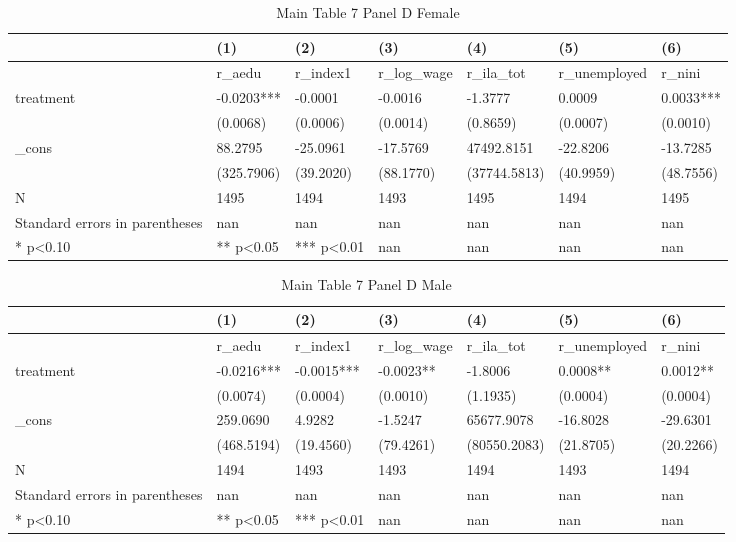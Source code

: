 \documentclass[11pt]{article}
\begin{document}
\clearpage
\begin{table}[!htbp]
\centering
\caption{Main Table 7 Panel D Female}
\label{tab:table7d_f}
\begin{tabular}{lllllll}
\toprule
 & (1) & (2) & (3) & (4) & (5) & (6) \\
\midrule
 & r\_aedu & r\_index1 & r\_log\_wage & r\_ila\_tot & r\_unemployed & r\_nini \\
treatment & -0.0203*** & -0.0001 & -0.0016 & -1.3777 & 0.0009 & 0.0033*** \\
 & (0.0068) & (0.0006) & (0.0014) & (0.8659) & (0.0007) & (0.0010) \\
\_cons & 88.2795 & -25.0961 & -17.5769 & 47492.8151 & -22.8206 & -13.7285 \\
 & (325.7906) & (39.2020) & (88.1770) & (37744.5813) & (40.9959) & (48.7556) \\
N & 1495 & 1494 & 1493 & 1495 & 1494 & 1495 \\
Standard errors in parentheses & nan & nan & nan & nan & nan & nan \\
* p<0.10 & ** p<0.05 & *** p<0.01 & nan & nan & nan & nan \\
\bottomrule
\end{tabular}

\end{table}

\clearpage
\begin{table}[!htbp]
\centering
\caption{Main Table 7 Panel D Male}
\label{tab:table7d_m}
\begin{tabular}{lllllll}
\toprule
 & (1) & (2) & (3) & (4) & (5) & (6) \\
\midrule
 & r\_aedu & r\_index1 & r\_log\_wage & r\_ila\_tot & r\_unemployed & r\_nini \\
treatment & -0.0216*** & -0.0015*** & -0.0023** & -1.8006 & 0.0008** & 0.0012** \\
 & (0.0074) & (0.0004) & (0.0010) & (1.1935) & (0.0004) & (0.0004) \\
\_cons & 259.0690 & 4.9282 & -1.5247 & 65677.9078 & -16.8028 & -29.6301 \\
 & (468.5194) & (19.4560) & (79.4261) & (80550.2083) & (21.8705) & (20.2266) \\
N & 1494 & 1493 & 1493 & 1494 & 1493 & 1494 \\
Standard errors in parentheses & nan & nan & nan & nan & nan & nan \\
* p<0.10 & ** p<0.05 & *** p<0.01 & nan & nan & nan & nan \\
\bottomrule
\end{tabular}

\end{table}
\end{document}
